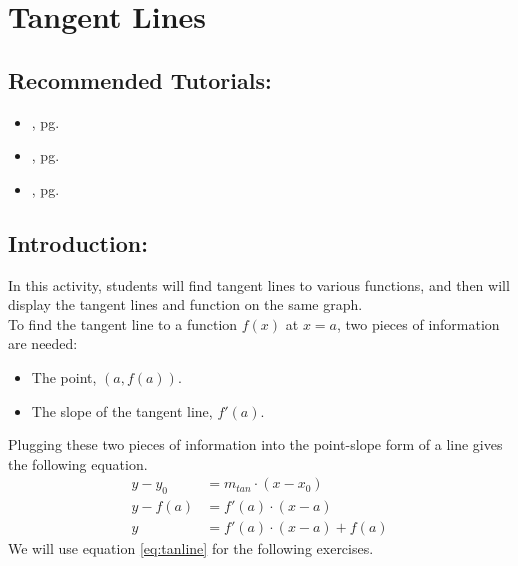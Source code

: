 \section{Tangent Lines}
\label{sec:tangent_lines}	

\subsection*{Recommended Tutorials:}
\begin{itemize}[noitemsep]
	\item {}, pg. \pageref{chp:assignment_operator}
	\item {}, pg. \pageref{chp:equation_solvers}
	\item {}, pg. \pageref{chp:derivative}
\end{itemize}

\subsection*{Introduction:}

In this activity, students will find tangent lines to various functions, and then will display the tangent lines and function on the same graph.\\

\noindent To find the tangent line to a function $f(x)$ at $x = a$, two pieces of information are needed:
\begin{itemize}
\item The point, $(a, f(a))$.
\item The slope of the tangent line, $f'(a)$.
\end{itemize}
Plugging these two pieces of information into the point-slope form of a line gives the following equation.
\begin{align}
y - y_0 &= m_{tan} \cdot (x-x_0) \nonumber\\ 
y - f(a) &= f'(a) \cdot (x-a) \nonumber\\
y &= f'(a) \cdot (x-a) + f(a) \label{eq:tanline}
\end{align}
We will use equation \eqref{eq:tanline} for the following exercises.

